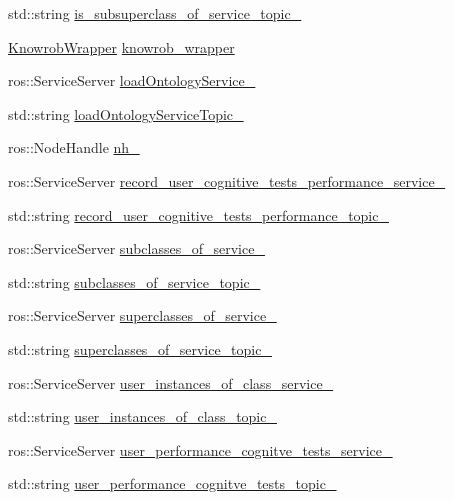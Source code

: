 \begin{DoxyCompactItemize}
\item 
std\-::string \hyperlink{classKnowrobWrapperCommunications_ab7d3b5d16106e51472f8fcb771be96aa}{is\-\_\-subsuperclass\-\_\-of\-\_\-service\-\_\-topic\-\_\-}
\item 
\hyperlink{classKnowrobWrapper}{Knowrob\-Wrapper} \hyperlink{classKnowrobWrapperCommunications_a6f4d52c56702c85b21b96df9caf95f46}{knowrob\-\_\-wrapper}
\item 
ros\-::\-Service\-Server \hyperlink{classKnowrobWrapperCommunications_aa0e819f7420b8e9f5315b9cfaac53bf4}{load\-Ontology\-Service\-\_\-}
\item 
std\-::string \hyperlink{classKnowrobWrapperCommunications_a6d5a84e3b69d020b5e11595a2ae871b5}{load\-Ontology\-Service\-Topic\-\_\-}
\item 
ros\-::\-Node\-Handle \hyperlink{classKnowrobWrapperCommunications_afe35871d80ea79c6446d2bdf39ba6204}{nh\-\_\-}
\item 
ros\-::\-Service\-Server \hyperlink{classKnowrobWrapperCommunications_a17e239928cdfac593e27e015e70ad376}{record\-\_\-user\-\_\-cognitive\-\_\-tests\-\_\-performance\-\_\-service\-\_\-}
\item 
std\-::string \hyperlink{classKnowrobWrapperCommunications_a1e44e99eba8f3a2fb196a9d215cec89c}{record\-\_\-user\-\_\-cognitive\-\_\-tests\-\_\-performance\-\_\-topic\-\_\-}
\item 
ros\-::\-Service\-Server \hyperlink{classKnowrobWrapperCommunications_aa694eb182b48822ca845e34096b17ad4}{subclasses\-\_\-of\-\_\-service\-\_\-}
\item 
std\-::string \hyperlink{classKnowrobWrapperCommunications_afbce99db77d63a6a052ebf7041cbc232}{subclasses\-\_\-of\-\_\-service\-\_\-topic\-\_\-}
\item 
ros\-::\-Service\-Server \hyperlink{classKnowrobWrapperCommunications_a4f20e98c56e5dd773524db0518ea55a2}{superclasses\-\_\-of\-\_\-service\-\_\-}
\item 
std\-::string \hyperlink{classKnowrobWrapperCommunications_aeed7bc627032586a30f7405ed7450dc2}{superclasses\-\_\-of\-\_\-service\-\_\-topic\-\_\-}
\item 
ros\-::\-Service\-Server \hyperlink{classKnowrobWrapperCommunications_a135ffaafe3229f5208de0622430fa9b6}{user\-\_\-instances\-\_\-of\-\_\-class\-\_\-service\-\_\-}
\item 
std\-::string \hyperlink{classKnowrobWrapperCommunications_aa6f2cc5d4d4dd17b22f490a89387dc35}{user\-\_\-instances\-\_\-of\-\_\-class\-\_\-topic\-\_\-}
\item 
ros\-::\-Service\-Server \hyperlink{classKnowrobWrapperCommunications_acc4fabd8a1dd21309c01b03e4c5129e5}{user\-\_\-performance\-\_\-cognitve\-\_\-tests\-\_\-service\-\_\-}
\item 
std\-::string \hyperlink{classKnowrobWrapperCommunications_a8304cf850b658cabf9a8494b6b745f1b}{user\-\_\-performance\-\_\-cognitve\-\_\-tests\-\_\-topic\-\_\-}
\end{DoxyCompactItemize}


